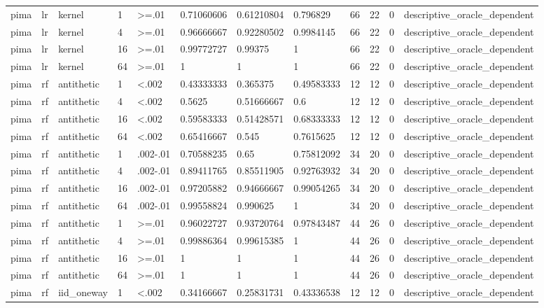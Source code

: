 \begin{tabular}{llllllllllll}
pima & lr & kernel & 1 & >=.01 & 0.71060606 & 0.61210804 & 0.796829 & 66 & 22 & 0 & descriptive\_oracle\_dependent \\
pima & lr & kernel & 4 & >=.01 & 0.96666667 & 0.92280502 & 0.9984145 & 66 & 22 & 0 & descriptive\_oracle\_dependent \\
pima & lr & kernel & 16 & >=.01 & 0.99772727 & 0.99375 & 1 & 66 & 22 & 0 & descriptive\_oracle\_dependent \\
pima & lr & kernel & 64 & >=.01 & 1 & 1 & 1 & 66 & 22 & 0 & descriptive\_oracle\_dependent \\
pima & rf & antithetic & 1 & <.002 & 0.43333333 & 0.365375 & 0.49583333 & 12 & 12 & 0 & descriptive\_oracle\_dependent \\
pima & rf & antithetic & 4 & <.002 & 0.5625 & 0.51666667 & 0.6 & 12 & 12 & 0 & descriptive\_oracle\_dependent \\
pima & rf & antithetic & 16 & <.002 & 0.59583333 & 0.51428571 & 0.68333333 & 12 & 12 & 0 & descriptive\_oracle\_dependent \\
pima & rf & antithetic & 64 & <.002 & 0.65416667 & 0.545 & 0.7615625 & 12 & 12 & 0 & descriptive\_oracle\_dependent \\
pima & rf & antithetic & 1 & .002-.01 & 0.70588235 & 0.65 & 0.75812092 & 34 & 20 & 0 & descriptive\_oracle\_dependent \\
pima & rf & antithetic & 4 & .002-.01 & 0.89411765 & 0.85511905 & 0.92763932 & 34 & 20 & 0 & descriptive\_oracle\_dependent \\
pima & rf & antithetic & 16 & .002-.01 & 0.97205882 & 0.94666667 & 0.99054265 & 34 & 20 & 0 & descriptive\_oracle\_dependent \\
pima & rf & antithetic & 64 & .002-.01 & 0.99558824 & 0.990625 & 1 & 34 & 20 & 0 & descriptive\_oracle\_dependent \\
pima & rf & antithetic & 1 & >=.01 & 0.96022727 & 0.93720764 & 0.97843487 & 44 & 26 & 0 & descriptive\_oracle\_dependent \\
pima & rf & antithetic & 4 & >=.01 & 0.99886364 & 0.99615385 & 1 & 44 & 26 & 0 & descriptive\_oracle\_dependent \\
pima & rf & antithetic & 16 & >=.01 & 1 & 1 & 1 & 44 & 26 & 0 & descriptive\_oracle\_dependent \\
pima & rf & antithetic & 64 & >=.01 & 1 & 1 & 1 & 44 & 26 & 0 & descriptive\_oracle\_dependent \\
pima & rf & iid\_oneway & 1 & <.002 & 0.34166667 & 0.25831731 & 0.43336538 & 12 & 12 & 0 & descriptive\_oracle\_dependent \\

\end{tabular}
